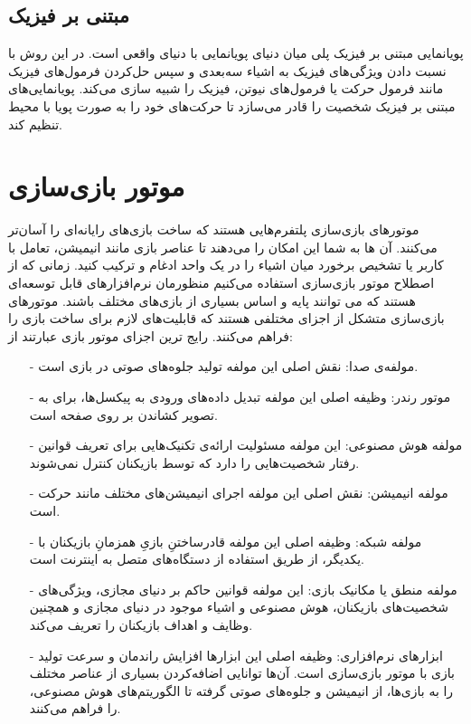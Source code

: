 \subsection{مبتنی بر فیزیک}

پویانمایی مبتنی بر فیزیک پلی میان دنیای پویانمایی با 
دنیای واقعی است. در این روش با نسبت دادن ویژگی‌های فیزیک به اشیاء سه‌بعدی و سپس حل‌کردن
فرمول‌های فیزیک مانند فرمول حرکت یا فرمول‌های نیوتن،
فیزیک را شبیه سازی می‌کند.
پویانمایی‌های مبتنی بر فیزیک شخصیت را قادر می‌سازد تا حرکت‌های خود را 
به صورت پویا با محیط تنظیم کند.




\section{موتور بازی‌سازی}
موتور‌های بازی‌سازی پلتفرم‌هایی هستند که ساخت بازی‌های رایانه‌ای را آسان‌تر می‌کنند.
آن ها به شما این امکان را می‌دهند تا عناصر بازی مانند انیمیشن، تعامل با کاربر یا تشخیص برخورد میان اشیاء را در یک واحد ادغام و ترکیب کنید.
\cite{barczak2019comparative}
زمانی که از اصطلاح موتور بازی‌سازی استفاده می‌کنیم منظورمان نرم‌افزارهای قابل توسعه‌ای هستند که می توانند پایه و اساس بسیاری از بازی‌های مختلف باشند.
\cite{GameEngineArchitecture}
موتورهای بازی‌سازی متشکل از اجزای مختلفی هستند که قابلیت‌های لازم برای ساخت بازی را فراهم می‌کنند.
رایج ترین اجزای موتور بازی عبارتند از:
\cite{barczak2019comparative}
\begin{itemize}
    \item[-] مولفه‌ی صدا: نقش اصلی این مولفه تولید جلوه‌های صوتی در بازی است.
    \item[-] موتور رندر: وظیفه اصلی این مولفه تبدیل داده‌های ورودی به پیکسل‌ها، برای به تصویر کشاندن بر روی صفحه است.
    \item[-] مولفه هوش مصنوعی: این مولفه مسئولیت ارائه‌ی تکنیک‌هایی برای تعریف قوانین رفتار شخصیت‌هایی را دارد که توسط بازیکنان کنترل نمی‌شوند.
    \item[-] مولفه انیمیشن: نقش اصلی این مولفه اجرای انیمیشن‌های مختلف مانند حرکت است.
    \item[-] مولفه شبکه: وظیفه اصلی این مولفه قادرساختنِ بازیِ همزمانِ بازیکنان با یکدیگر، از طریق استفاده از دستگاه‌های متصل به اینترنت است.
    \item[-] مولفه منطق یا مکانیک بازی: این مولفه قوانین حاکم بر دنیای مجازی، ویژگی‌های شخصیت‌های بازیکنان، هوش مصنوعی و اشیاء موجود در دنیای مجازی و همچنین وظایف و اهداف بازیکنان را تعریف می‌کند.
    \item[-] ابزارهای نرم‌افزاری: وظیفه اصلی این ابزارها افزایش راندمان و سرعت تولید بازی با موتور بازی‌سازی است. آن‌ها توانایی اضافه‌کردن بسیاری از عناصر مختلف را به بازی‌ها، از انیمیشن و جلوه‌های صوتی گرفته تا الگوریتم‌های هوش مصنوعی، را فراهم می‌کنند.   
\end{itemize}

